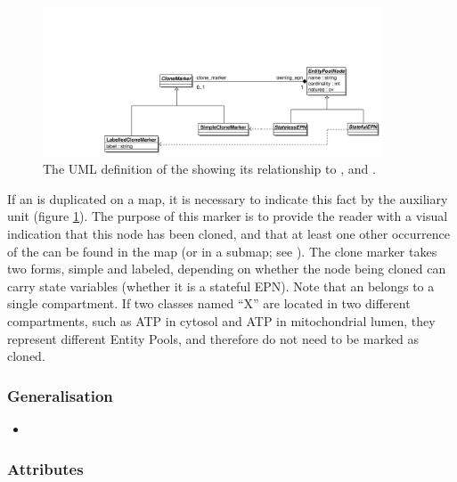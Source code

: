 \label{defn:CloneMarker}
\label{sec:techref:cloneMarker}

\begin{figure}[htb]
  \centering
  \includegraphics[width = 0.9\textwidth]{images/clonemarkeruml}
  \caption{The UML definition of the  showing
    its relationship to , 
    and .}
  \label{fig:techref:clonemarkeruml}
\end{figure}

If an  is duplicated on a map, it is
necessary to indicate this fact by the 
auxiliary unit (figure \ref{fig:techref:clonemarkeruml}).  The purpose of this
marker is to provide the reader with a visual indication that this
node has been cloned, and that at least one other occurrence of the
 can be found in the map (or in a submap;
see ).  The clone marker takes two forms, simple and
labeled, depending on whether the node being cloned can carry state
variables (\ie whether it is a stateful EPN). Note that an
 belongs to a single compartment. If two
classes named ``X'' are located in two different compartments, such as
ATP in cytosol and ATP in mitochondrial lumen, they represent
different Entity Pools, and therefore do not need to be marked as
cloned.

\subsubsection{Generalisation}

\begin{itemize}
\item {}
\end{itemize}

\subsubsection{Attributes}


